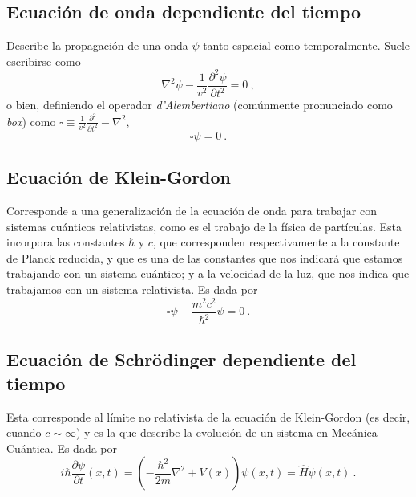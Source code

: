 \subsection*{Ecuación de onda dependiente del tiempo}

Describe la propagación de una onda $\psi$ tanto espacial como temporalmente. Suele escribirse como
\begin{equation}
    \nabla^2 \psi - \frac{1}{v^2}\frac{\partial^2 \psi}{\partial t^2} = 0 \ ,
\end{equation}
o bien, definiendo el operador \emph{d'Alembertiano} (comúnmente pronunciado como \emph{box}) como $\square \equiv \frac{1}{v^2} \frac{\partial^2}{\partial t^2} - \nabla^2$,
\begin{equation}
    \square \psi = 0 \ .
\end{equation}

\subsection*{Ecuación de Klein-Gordon}

Corresponde a una generalización de la ecuación de onda para trabajar con sistemas cuánticos relativistas, como es el trabajo de la física de partículas. Esta incorpora las constantes $\hbar$ y $c$, que corresponden respectivamente a la constante de Planck reducida, y que es una de las constantes que nos indicará que estamos trabajando con un sistema cuántico; y a la velocidad de la luz, que nos indica que trabajamos con un sistema relativista. Es dada por
\begin{equation}
    \square \psi - \frac{m^2c^2}{\hbar^2}\psi = 0 \ .
\end{equation}


\subsection*{Ecuación de Schrödinger dependiente del tiempo}
Esta corresponde al límite no relativista de la ecuación de Klein-Gordon (es decir, cuando $c \sim \infty$) y es la que describe la evolución de un sistema en Mecánica Cuántica. Es dada por
\begin{equation} \label{eq:schrodinger}
    i \hbar \frac{\partial \psi}{\partial t}(x,t) = \left( -\frac{\hbar^2}{2m} \nabla^2 + V(x) \right) \psi(x,t) = \hat{H}\psi(x,t) \ .
\end{equation}


